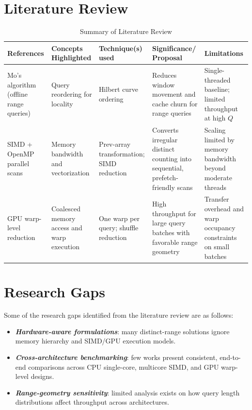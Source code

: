 \documentclass[12pt,a4paper]{article}
\begin{document}
    
	\clearpage
	\section{Literature Review}
	
	
	\begin{longtable}[htp]{|p{2cm}|p{2.5cm}|p{2.5cm}|p{3cm}|p{3.5cm}|}
	\caption{Summary of Literature Review}
	\label{Table1}
	\hline \textbf {References} & \textbf{Concepts
	Highlighted} & \textbf{Technique(s) used} & \textbf{Significance/
	Proposal} & \textbf{Limitations} \\
		\hline Mo's algorithm (offline range queries) & Query reordering for locality & Hilbert curve ordering & Reduces window movement and cache churn for range queries & Single-threaded baseline; limited throughput at high $Q$ \\
		
		\hline SIMD + OpenMP parallel scans & Memory bandwidth and vectorization & Prev-array transformation; SIMD reduction & Converts irregular distinct counting into sequential, prefetch-friendly scans & Scaling limited by memory bandwidth beyond moderate threads \\
        
        \hline GPU warp-level reduction & Coalesced memory access and warp execution & One warp per query; shuffle reduction & High throughput for large query batches with favorable range geometry & Transfer overhead and warp occupancy constraints on small batches \\

 	\hline
	\end{longtable}

	
	
	\newpage
	\section{Research Gaps}
	Some of the research gaps identified from the literature review are as follows: 
	\begin{itemize}
		\item \textit{\textbf{Hardware-aware formulations}}: many distinct-range solutions ignore memory hierarchy and SIMD/GPU execution models.
		\item \textit{\textbf{Cross-architecture benchmarking}}: few works present consistent, end-to-end comparisons across CPU single-core, multicore SIMD, and GPU warp-level designs.
		\item \textit{\textbf{Range-geometry sensitivity}}: limited analysis exists on how query length distributions affect throughput across architectures.
	\end{itemize}
\end{document}
